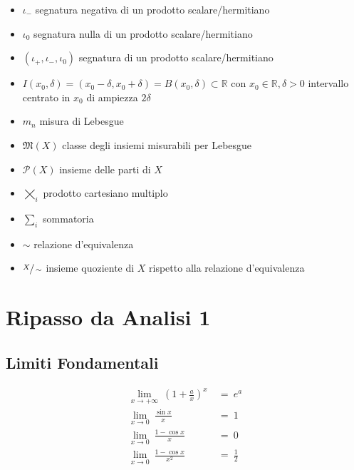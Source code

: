\documentclass[12pt, twoside, italian]{book}
\begin{document}
\begin{itemize}[label=\hspace{-0.5em}]
		\item $\iota_-$ segnatura negativa di un prodotto scalare/hermitiano
		\item $\iota_0$ segnatura nulla di un prodotto scalare/hermitiano
		\item $(\iota_+, \iota_-, \iota_0)$ segnatura di un prodotto scalare/hermitiano
		\item $I(x_0, \delta) = (x_0 - \delta, x_0 + \delta) = B(x_0, \delta) \subset \mathbb{R}$ con $x_0 \in \mathbb{R}, \delta > 0$ intervallo centrato in $x_0$ di ampiezza $2\delta$
		\item $m_n$ misura di Lebesgue
		\item $\mathfrak{M}(X)$ classe degli insiemi misurabili per Lebesgue
		\item $\mathcal{P}(X)$ insieme delle parti di $X$
		\item $\varprod\limits_i$ prodotto cartesiano multiplo
		\item $\sum\limits_i$ sommatoria
		\item $\sim$ relazione d'equivalenza
		\item $\sfrac{X}{\sim}$ insieme quoziente di $X$ rispetto alla relazione d'equivalenza
	\end{itemize}
 	\newpage
 	\chapter*{Ripasso da Analisi 1}
 	\thispagestyle{empty}
 	\pagestyle{fancy}
 	\vspace{0.5cm}
 	\section*{Limiti Fondamentali}
 	\[
 	\begin{aligned}
 		\lim_{x \to +\infty}\ \left(1 + \frac{a}{x}\right)^x\ &=\ e^a \\
 		\lim_{x \to 0}\ \frac{\sin x}{x}\ &=\ 1 \\
 		\lim_{x \to 0}\ \frac{1 - \cos x}{x}\ &=\ 0 \\
 		\lim_{x \to 0}\ \frac{1 - \cos x}{x^2}\ &=\ \frac{1}{2}
 	\end{aligned}
 	\]
 	\vspace{0.5cm}
\end{document}
